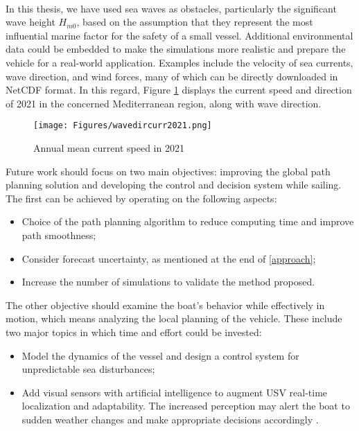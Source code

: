 \vspace{0.3cm}\\
In this thesis, we have used sea waves as obstacles, particularly the significant wave height $H_{m0}$, based on the assumption that they represent the most influential marine factor for the safety of a small vessel. Additional environmental data could be embedded to make the simulations more realistic and prepare the vehicle for a real-world application. Examples include the velocity of sea currents, wave direction, and wind forces, many of which can be directly downloaded in NetCDF format. In this regard, Figure \ref{currentspeed} displays the current speed and direction of 2021 in the concerned Mediterranean region, along with wave direction.

\begin{figure}[h]
	\centering
	\texttt{[image: Figures/wavedircurr2021.png]}
	\caption{Annual mean current speed in 2021}
	\label{currentspeed}
\end{figure} 
Future work should focus on two main objectives: improving the global path planning solution and developing the control and decision system while sailing. The first can be achieved by operating on the following aspects:
\begin{itemize}[itemsep=0pt]
	\item Choice of the path planning algorithm to reduce computing time and improve path smoothness;
	\item Consider forecast uncertainty, as mentioned at the end of \autoref{approach};
	\item Increase the number of simulations to validate the method proposed.
\end{itemize}
The other objective should examine the boat's behavior while effectively in motion, which means analyzing the local planning of the vehicle. These include two major topics in which time and effort could be invested:
\begin{itemize}[itemsep=0pt]
	\item Model the dynamics of the vessel and design a control system for unpredictable sea disturbances;
	\item Add visual sensors with artificial intelligence to augment USV real-time localization and adaptability. The increased perception may alert the boat to sudden weather changes and make appropriate decisions accordingly \cite{zhang2021unmanned}.
\end{itemize}

